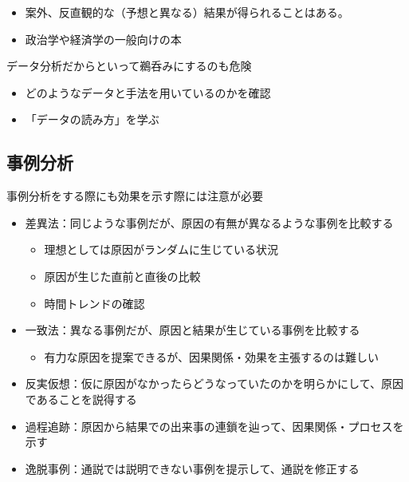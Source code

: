 \documentclass[
  xelatex,
  ja=standard]{bxjsarticle}
\providecommand{\tightlist}{%
  \setlength{\itemsep}{0pt}\setlength{\parskip}{0pt}}\usepackage{longtable,booktabs,array}
\begin{document}
\begin{itemize}
\tightlist
\item
  案外、反直観的な（予想と異なる）結果が得られることはある。
\item
  政治学や経済学の一般向けの本\citep{banerjee2020, kitamura2020}
\end{itemize}

データ分析だからといって鵜呑みにするのも危険

\begin{itemize}
\tightlist
\item
  どのようなデータと手法を用いているのかを確認
\item
  「データの読み方」を学ぶ\citep{sugawara2022, ogiwara2023, tsutsui2023}
\end{itemize}

\hypertarget{ux4e8bux4f8bux5206ux6790}{%
\subsection{事例分析}\label{ux4e8bux4f8bux5206ux6790}}

事例分析をする際にも効果を示す際には注意が必要\citep{kume2013, ito2022}

\begin{itemize}
\tightlist
\item
  差異法：同じような事例だが、原因の有無が異なるような事例を比較する

  \begin{itemize}
  \tightlist
  \item
    理想としては原因がランダムに生じている状況
  \item
    原因が生じた直前と直後の比較
  \item
    時間トレンドの確認
  \end{itemize}
\item
  一致法：異なる事例だが、原因と結果が生じている事例を比較する

  \begin{itemize}
  \tightlist
  \item
    有力な原因を提案できるが、因果関係・効果を主張するのは難しい
  \end{itemize}
\item
  反実仮想：仮に原因がなかったらどうなっていたのかを明らかにして、原因であることを説得する
\item
  過程追跡：原因から結果での出来事の連鎖を辿って、因果関係・プロセスを示す
\item
  逸脱事例：通説では説明できない事例を提示して、通説を修正する
\end{itemize}


  
\end{document}
